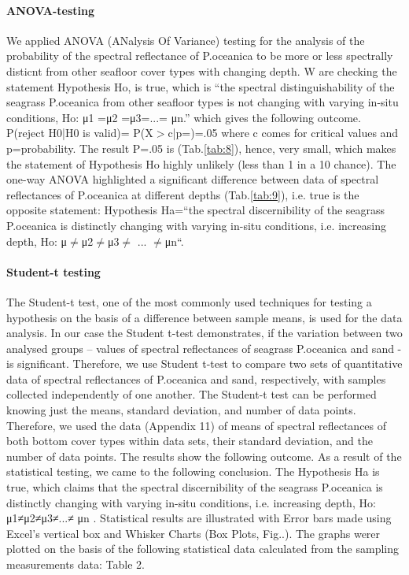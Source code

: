 \documentclass[10pt, a4paper]{article}
\begin{document}
\paragraph{ANOVA-testing}
We applied ANOVA (ANalysis Of Variance) testing for the analysis of the probability of the
spectral reflectance of P.oceanica to be more or less spectrally disticnt from other seafloor cover
types with changing depth. W are checking the statement Hypothesis Ho, is true, which is “the
spectral distinguishability of the seagrass P.oceanica from other seafloor types is not changing with
varying in-situ conditions, Ho: μ1 =μ2 =μ3=...= μn.” which gives the following outcome.
P(reject H0|H0 is valid)= P(X$>$c|p=)=.05
where c comes for critical values and p=probability.
The result P=.05 is (Tab.\ref{tab:8}), hence, very small, which makes the statement of Hypothesis Ho highly unlikely
(less than 1 in a 10 chance). The one-way ANOVA highlighted a significant difference between data
of spectral reflectances of P.oceanica at different depths (Tab.\ref{tab:9}), i.e. true is the opposite statement:
Hypothesis Ha=“the spectral discernibility of the seagrass P.oceanica is distinctly changing with
varying in-situ conditions, i.e. increasing depth, Ho: μ$\neq$μ2$\neq$μ3$\neq$ ... $\neq$μn“.

\paragraph{Student-t testing}
The Student-t test, one of the most commonly used techniques for testing a hypothesis on the basis
of a difference between sample means, is used for the data analysis. In our case the Student t-test demonstrates, if the variation
between two analysed groups – values of spectral reflectances of seagrass P.oceanica and sand - is
significant. Therefore, we use Student t-test to compare two sets of quantitative data of spectral
reflectances of P.oceanica and sand, respectively, with samples collected independently of one
another. The Student-t test can be performed knowing just the means, standard deviation, and number
of data points. Therefore, we used the data (Appendix 11) of means of spectral reflectances of both
bottom cover types within data sets, their standard deviation, and the number of data points.
The results show the following outcome.
As a result of the statistical testing, we came to the following conclusion.
The Hypothesis Ha is true, which claims that the spectral discernibility of the seagrass P.oceanica is
distinctly changing with varying in-situ conditions, i.e. increasing depth, Ho: μ1≠μ2≠μ3≠...≠ μn .
Statistical results are illustrated with Error bars made using Excel's vertical box and Whisker Charts
(Box Plots, Fig..).
The graphs werer plotted on the basis of the following statistical data calculated from the sampling
measurements data: Table 2.
\end{document}
